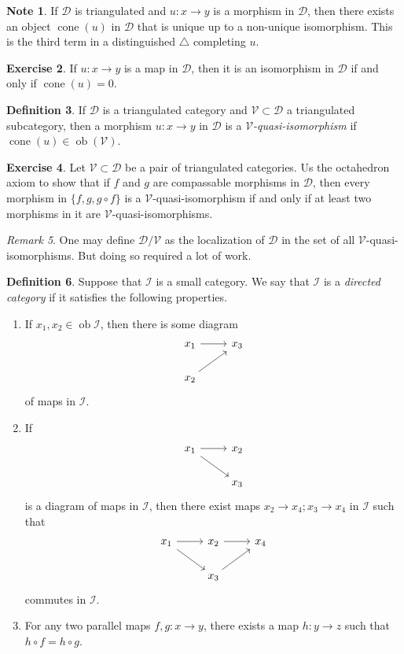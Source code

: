 \documentclass[10pt,letterpaper,cm]{nupset}
\theoremstyle{definition}
\newtheorem{definition}{Definition}[subsection]
\newtheorem{note}[definition]{Note}
\theoremstyle{theorem}
\newtheorem{exercise}[definition]{Exercise}
\theoremstyle{remark}
\newtheorem{remark}[definition]{Remark}
\newcommand{\1}{\mathbf{1}}
\renewcommand{\d}{\mathscr{D}}
\renewcommand{\i}{\mathscr{I}}
\renewcommand{\v}{\mathscr{V}}
\newcommand{\0}{\vec 0}
\DeclareMathOperator{\ob}{ob}
\DeclareMathOperator{\cone}{cone}
\begin{document}
\begin{note}
 If $\d$ is triangulated and $u: x \to y$ is a morphism in $\d$, then there exists an object $\cone(u)$ in $\d$ that is unique up to a non-unique isomorphism. This is the third term in a distinguished $\triangle$ completing $u$. 
\end{note}

\begin{exercise}
If $u : x \to y$ is a map in $\d$, then it is an isomorphism in $\d$ if and only if $\cone(u) =0$. 
\end{exercise}

\begin{definition}
If $\d$ is a triangulated category and $\v\subset \d$ a triangulated subcategory, then a morphism $u : x \to y$ in $\d$ is a \textit{$\v$-quasi-isomorphism} if $\cone(u) \in \ob(\v)$.
\end{definition}

\begin{exercise}
Let $\v \subset \d$ be a pair of triangulated categories. Us the octahedron axiom to show that if $f$ and $g$ are compassable morphisms in $\d$, then every morphism in $\{f, g, g \circ f\}$ is a $\v$-quasi-isomorphism if and only if at least two morphisms in it are $\v$-quasi-isomorphisms. 
\end{exercise}

\begin{remark}
One may define $\d/\v$ as the localization of $\d$ in the set of all $\v$-quasi-isomorphisms. But doing so required a lot of work. 
\end{remark}

\begin{definition}
Suppose that $\i$ is a small category. We say that $\i$ is a \textit{directed category} if it satisfies the following properties.
\begin{enumerate}
\item If $x_1, x_2 \in \ob{\i}$, then there is some diagram 
\[
\begin{tikzcd}
x_1 \arrow[r]  & x_3 \\
x_2 \arrow[ru] &    
\end{tikzcd}
\] of maps in $\i$.
\item If 
\[
\begin{tikzcd}
x_1 \arrow[r] \arrow[rd] & x_2 \\
                         & x_3
\end{tikzcd}
\] is a diagram of maps in $\i$, then there exist maps $x_2 \to x_4; x_3 \to x_4$ in $\i$ such that 
\[
\begin{tikzcd}
x_1 \arrow[r] \arrow[rd] & x_2 \arrow[r]  & x_4 \\
                         & x_3 \arrow[ru] &    
\end{tikzcd}
\] commutes in $\i$.
\item For any two parallel maps $f,g : x \to y$, there exists a map $h: y \to z$ such that $h \circ f = h \circ g$. 
\end{enumerate}
\end{definition}
\end{document}
